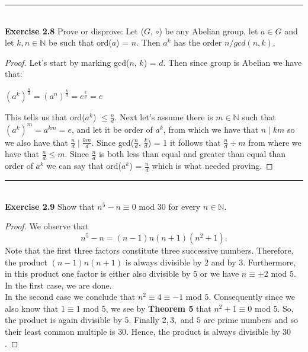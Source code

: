 \documentclass[a4paper]{article}
\begin{document}
\noindent\rule{12cm}{0.4pt}\\
\noindent \textbf{Exercise 2.8} Prove or disprove: Let ($G$, $\circ$) be any Abelian group, let $a \in G$ and let $k, n \in \mathbb{N}$ be such that ord($a$) = $n$. Then $a^{k}$ has the order $n/gcd(n,k)$.
\begin{proof}
Let's start by marking gcd($n$, $k$) = $d$. Then since group is Abelian we have that:
\begin{center}
$(a^k)^{\frac{n}{d}} = (a^n)^{\frac{k}{d}}= e^{\frac{k}{d}} = e$
\end{center}
This tells us that ord($a^k$) $\leq \frac{n}{d}$. Next let's assume there is $m \in \mathbb{N}$ such that $(a^k)^m=a^{km}=e$, and let it be order of $a^k$, from which we have that $n \mid km$ so we also have that $\frac{n}{d} \mid \frac{km}{d}$. Since gcd($\frac{n}{d}$, $\frac{k}{d}$) = 1 it follows that $\frac{n}{d} \div m$ from where we have that $\frac{n}{d} \leq m$. Since $\frac{n}{d}$ is both less than equal and greater than equal than order of $a^k$ we can say that ord($a^k$) = $\frac{n}{d}$ which is what needed proving.
\end{proof}



\noindent\rule{12cm}{0.4pt}\\
\noindent \textbf{Exercise 2.9} Show that $n^5 - n \equiv 0$ mod 30 for every $n \in \mathbb{N}$.
\begin{proof}
We observe that
$$ n^{5} - n = (n - 1)n(n+1)(n^{2} +1).$$
Note that the first three factors constitute three successive numbers. Therefore, the product $(n-1)n(n+1)$ is always divisible by $2$ and by $3$. Furthermore, in this product one factor is either also divisible by $5$ or we have $n \equiv \pm 2$ mod $5$. In the first case, we are done.\\
In the second case we conclude that $n^{2} \equiv 4 \equiv -1$ mod $5$. Consequently since we also know that $1 \equiv 1$ mod $5$, we see by \textbf{Theorem 5} that $n^{2} + 1 \equiv 0$ mod $5$. So, the product is again divisible by $5$. Finally $2, 3,$ and $5$ are prime numbers and so their least common multiple is $30$. Hence, the product is always divisible by $30$.
\end{proof}
\end{document}
